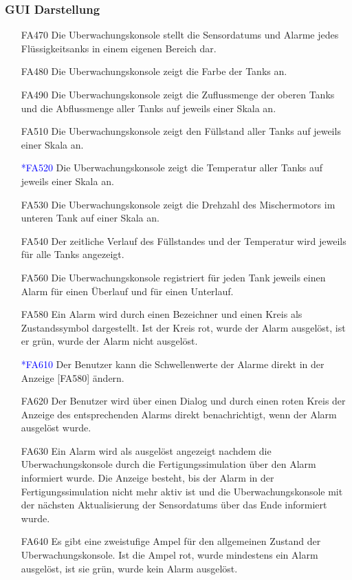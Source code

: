 \documentclass[parskip=full]{scrartcl}
\begin{document}
\subsubsection{GUI Darstellung}
\begin{enumerate}
  \item[FA470] Die \gls{Uberwachungskonsole} stellt die \glspl{Sensordatum} und Alarme jedes Flüssigkeitsanks in einem eigenen Bereich dar.
  \item[FA480] Die \gls{Uberwachungskonsole} zeigt die Farbe der Tanks an.
  \item[FA490] Die \gls{Uberwachungskonsole} zeigt die Zuflussmenge der oberen Tanks und die Abflussmenge aller Tanks auf jeweils einer Skala an.
  \item[FA510] Die \gls{Uberwachungskonsole} zeigt den Füllstand aller Tanks auf jeweils einer Skala an.
  \item[\textcolor{blue}{*FA520}] Die \gls{Uberwachungskonsole} zeigt die Temperatur aller Tanks auf jeweils einer Skala an.
  \item[FA530] Die \gls{Uberwachungskonsole} zeigt die Drehzahl des Mischermotors im unteren Tank auf einer Skala an.
  \item[FA540] Der zeitliche Verlauf des Füllstandes und der Temperatur wird jeweils für alle Tanks angezeigt.
  \item[FA560] Die \gls{Uberwachungskonsole} registriert für jeden Tank jeweils einen Alarm für einen Überlauf und für einen Unterlauf.
  \item[FA580] Ein Alarm wird durch einen Bezeichner und einen Kreis als Zustandssymbol dargestellt. Ist der Kreis rot, wurde der Alarm ausgelöst, ist er grün, wurde der Alarm nicht ausgelöst.
  \item[\textcolor{blue}{*FA610}] Der Benutzer kann die Schwellenwerte der Alarme direkt in der Anzeige [FA580] ändern.
  \item[FA620] Der Benutzer wird über einen Dialog und durch einen roten Kreis der Anzeige des entsprechenden Alarms direkt benachrichtigt, wenn der Alarm ausgelöst wurde.
  \item[FA630] Ein Alarm wird als ausgelöst angezeigt nachdem die \gls{Uberwachungskonsole} durch die \gls{Fertigungssimulation} \"uber den Alarm informiert wurde. Die Anzeige besteht, bis der Alarm in der
    \gls{Fertigungssimulation} nicht mehr aktiv ist und die \gls{Uberwachungskonsole} mit der nächsten Aktualisierung der \glspl{Sensordatum} über das Ende informiert wurde.
  \item[FA640] Es gibt eine zweistufige Ampel für den allgemeinen Zustand der \gls{Uberwachungskonsole}. Ist die Ampel rot, wurde mindestens ein Alarm ausgelöst, ist sie grün, wurde kein Alarm ausgelöst.

\end{enumerate}
\end{document}
